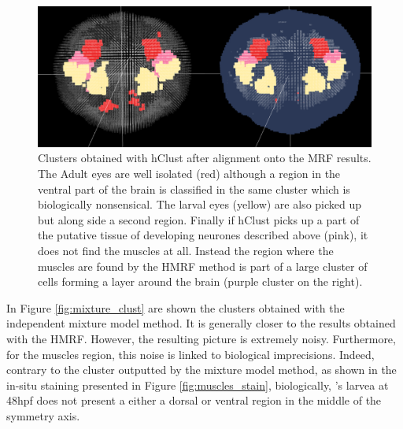 	\begin{figure}[H]
\centerline{\includegraphics[width=\linewidth]{gfx/chapter6/hclust.png}}
\caption{Clusters obtained with hClust after alignment onto the MRF results. The Adult eyes are well isolated (red) although a region in the ventral part of the brain is classified in the same cluster which is biologically nonsensical. The larval eyes (yellow) are also picked up but along side a second region. Finally if hClust picks up a part of the putative tissue of developing neurones described above (pink), it does not find the muscles at all. Instead the region where the muscles are found by the HMRF method is part of a large cluster of cells forming a layer around the brain (purple cluster on the right).}
\label{fig:hclust_clust}
	\end{figure}
	
	In Figure \ref{fig:mixture_clust} are shown the clusters obtained with the independent mixture model method. It is generally closer to the results obtained with the HMRF. However, the resulting picture is extremely noisy. Furthermore, for the muscles region, this noise is linked to biological imprecisions. Indeed, contrary to the cluster outputted by the mixture model method, as shown in the in-situ staining presented in Figure \ref{fig:muscles_stain}, biologically, \platy{}'s larvea at 48hpf does not present a either a dorsal or ventral region in the middle of the symmetry axis. 
	

